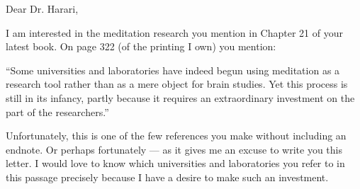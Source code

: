 \documentclass[12pt,stdletter,orderfromtodate,sigleft]{newlfm}
\begin{document}
\begin{newlfm}
\blindtext

Dear Dr. Harari,

I am interested in the meditation research you mention in Chapter 21 of
your latest book. On page 322 (of the printing I own) you mention:

``Some universities and laboratories have indeed begun using meditation as a research
tool rather than as a mere object for brain studies. Yet this process is still in its
infancy, partly because it requires an extraordinary investment on the part of the
researchers.''

Unfortunately, this is one of the few references you make without including an
endnote. Or perhaps fortunately --- as it gives me an excuse to write you this
letter. I would love to know which universities and laboratories you refer to in this
passage precisely because I have a desire to make such an investment.

\end{newlfm}
\end{document}
